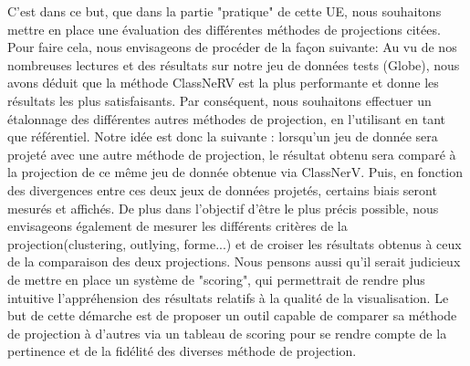 \medskip
C'est dans ce but, que dans la partie "pratique" de cette UE, nous souhaitons mettre en place une évaluation des différentes méthodes de projections citées.
Pour faire cela, nous envisageons de procéder de la façon suivante: \newline
Au vu de nos nombreuses lectures et  des résultats sur notre jeu de données tests (Globe), nous avons déduit que la méthode ClassNeRV est la plus performante et donne les résultats les plus satisfaisants. 
Par conséquent, nous souhaitons effectuer un étalonnage des différentes autres méthodes de projection, en l'utilisant en tant que référentiel. \newline
Notre idée est donc la suivante : lorsqu'un jeu de donnée sera projeté avec une autre méthode de projection, 
le résultat obtenu sera comparé à la projection de ce même jeu de donnée obtenue via ClassNerV.
Puis, en fonction des divergences entre ces deux jeux de données projetés, certains biais seront mesurés et affichés.
De plus dans l'objectif d'être le plus précis possible, nous envisageons également de mesurer les différents critères de la projection(clustering, outlying, forme...) et de croiser les résultats obtenus à ceux de la comparaison des deux projections.
Nous pensons aussi qu'il serait judicieux de mettre en place un système de "scoring", qui permettrait de rendre plus intuitive l'appréhension des résultats relatifs à la qualité de la visualisation. 
\newline 
Le but de cette démarche est de proposer un outil capable de comparer sa méthode de projection à d'autres via un tableau de scoring pour se rendre compte de la pertinence et de la fidélité des diverses méthode de projection.

